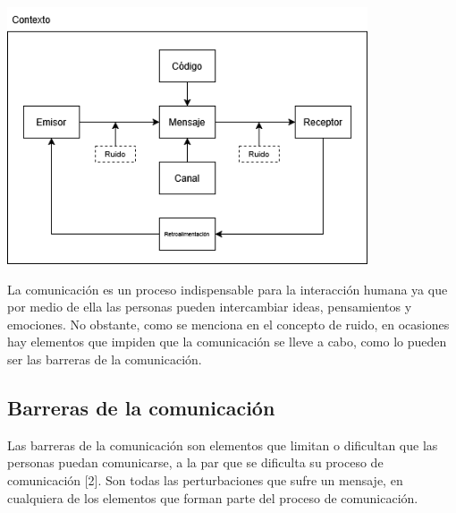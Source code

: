 \begin{center}
    \includegraphics[width=0.8\textwidth]{Images/Cap 2/ProcesoComunicacion.png}
\end{center}

La comunicación es un proceso indispensable para la interacción humana ya que por medio de ella las personas pueden intercambiar ideas, pensamientos y emociones. No obstante, como se menciona en el concepto de ruido, en ocasiones hay elementos que impiden que la comunicación se lleve a cabo, como lo pueden ser las barreras de la comunicación.
\subsection{Barreras de la comunicación}
Las barreras de la comunicación son elementos que limitan o dificultan que las personas puedan comunicarse, a la par que se dificulta su proceso de comunicación [2]. Son todas las perturbaciones que sufre un mensaje, en cualquiera de los elementos que forman parte del proceso de comunicación.

